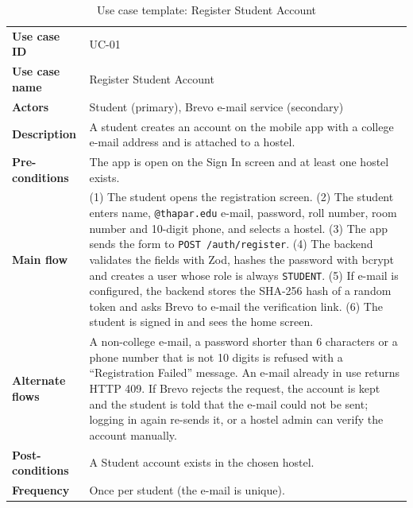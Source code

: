 \documentclass[11pt,a4paper]{article}
\begin{document}
\begin{table}[H]
\centering
\caption{Use case template: Register Student Account}
\label{tab:uc1}
\begin{tabular}{@{}L{3.1cm}L{11.7cm}@{}}
\toprule
\textbf{Use case ID} & UC-01\\
\textbf{Use case name} & Register Student Account\\
\textbf{Actors} & Student (primary), Brevo e-mail service (secondary)\\
\textbf{Description} & A student creates an account on the mobile app with a
college e-mail address and is attached to a hostel.\\
\textbf{Pre-conditions} & The app is open on the Sign In screen and at least one
hostel exists.\\
\textbf{Main flow} & (1) The student opens the registration screen. (2) The
student enters name, \texttt{@thapar.edu} e-mail, password, roll number, room
number and 10-digit phone, and selects a hostel. (3) The app sends the form to
\texttt{POST /auth/register}. (4) The backend validates the fields with Zod,
hashes the password with bcrypt and creates a user whose role is always
\texttt{STUDENT}. (5) If e-mail is configured, the backend stores the SHA-256
hash of a random token and asks Brevo to e-mail the verification link.
(6) The student is signed in and sees the home screen.\\
\textbf{Alternate flows} & A non-college e-mail, a password shorter than 6
characters or a phone number that is not 10 digits is refused with a
``Registration Failed'' message. An e-mail already in use returns HTTP 409. If
Brevo rejects the request, the account is kept and the student is told that the
e-mail could not be sent; logging in again re-sends it, or a hostel admin can
verify the account manually.\\
\textbf{Post-conditions} & A Student account exists in the chosen hostel.\\
\textbf{Frequency} & Once per student (the e-mail is unique).\\
\bottomrule
\end{tabular}
\end{table}
\end{document}
